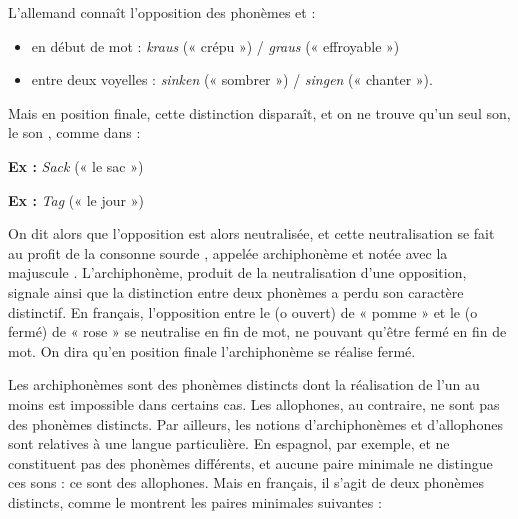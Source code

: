 L’allemand connaît l’opposition des phonèmes  et  :
\begin{itemize}
\item en début de mot : \textit{kraus} (« crépu ») / \textit{graus} (« effroyable »)
\item entre deux voyelles : \textit{sinken} (« sombrer ») / \textit{singen} (« chanter »).
\end{itemize}
Mais en position finale, cette distinction disparaît, et on ne trouve qu’un seul son, le son \bipa{[k]}, comme dans :

\noindent\textbf{Ex :} \textit{Sack} \bipa{[zak]} (« le sac »)

\noindent\textbf{Ex :} \textit{Tag} \bipa{[ta:k]} (« le jour »)

On dit alors que l’opposition est alors neutralisée, et cette neutralisation se fait au profit de la consonne sourde , appelée archiphonème et notée avec la majuscule . L’archiphonème, produit de la neutralisation d’une opposition, signale ainsi que la distinction entre deux phonèmes a perdu son caractère distinctif. En français, l’opposition entre le \bipa{[ɔ]} (o ouvert) de « pomme » et le \bipa{[o]} (o fermé) de « rose » se neutralise en fin de mot,  ne pouvant qu’être fermé en fin de mot. On dira qu’en position finale l’archiphonème  se réalise fermé.

Les archiphonèmes sont des phonèmes distincts dont la réalisation de l’un au moins est impossible dans certains cas. Les allophones, au contraire, ne sont pas des phonèmes distincts. Par ailleurs, les notions d’archiphonèmes et d’allophones sont relatives à une langue particulière. En espagnol, par exemple,  et  ne constituent pas des phonèmes différents, et aucune paire minimale ne distingue ces sons : ce sont des allophones. Mais en français, il s’agit de deux phonèmes distincts, comme le montrent les paires minimales suivantes :

